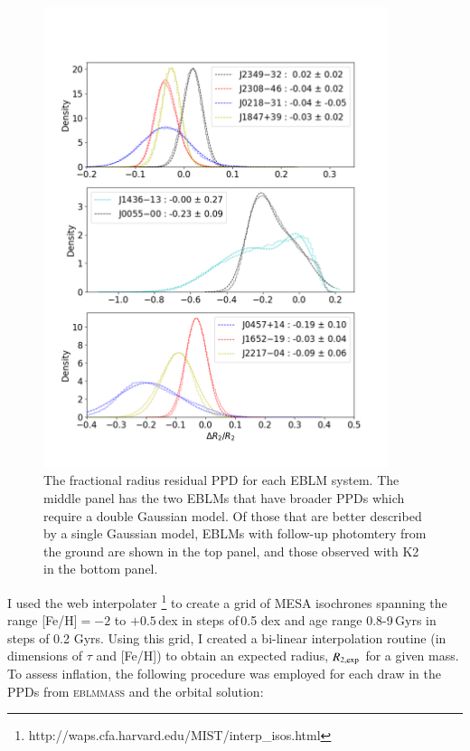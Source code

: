 \begin{figure}
    \centering
    \includegraphics[width=0.9\textwidth]{9-Discussion/images/radius_inflation_EBLMs.png}
    \caption{The fractional radius residual PPD for each EBLM system. The middle panel has the two EBLMs that have broader PPDs which require a double Gaussian model. Of those that are better described by a single Gaussian model, EBLMs with follow-up photomtery from the ground are shown in the top panel, and those observed with K2 in the bottom panel. }
    \label{discussion:fig:radius_inflation}
\end{figure}

I used the web interpolater \footnote{http://waps.cfa.harvard.edu/MIST/interp\_isos.html} to create a grid of MESA isochrones  spanning the range [Fe/H]$=-2$ to $+0.5$\,dex in steps of\,0.5 dex and age range 0.8-9\,Gyrs in steps of 0.2 Gyrs. Using this grid, I created a bi-linear interpolation routine (in dimensions of $\tau$ and [Fe/H]) to obtain an expected radius, $R_{2,\rm exp}$ for a given mass. To assess inflation, the following procedure was employed for each draw in the PPDs from \textsc{eblmmass} and the orbital solution:

